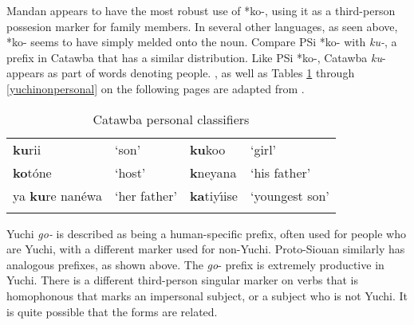 \documentclass[output=paper]{LSP/langsci}
\begin{document}
Mandan appears to have the most robust use of *ko-, using it as a third-person possesion marker for family members. In several other languages, as seen above, *ko- seems to have simply melded onto the noun. Compare PSi *ko- with \emph{ku-}, a prefix in Catawba that has a similar distribution. Like PSi *ko-, Catawba \emph{ku}- appears as part of words denoting people. , as well as Tables \ref{catawbaclassifiers} through \ref{yuchinonpersonal} on the following pages are adapted from \citet{Rankin1998scy}.

\begin{table}  
\caption{Catawba personal classifiers} \label{catawbaclassifiers}
    \begin{tabularx}{.75\textwidth}{XXXX}\lsptoprule
        \textbf{ku}rii & `son' & \textbf{ku}koo & `girl' \\ 
        \textbf{ko}t\'one & `host' & \textbf{k\textipa{@}}neyana & `his father' \\ 
			{ya \textbf{ku}re nan\'ewa} & `her father' & {\textbf{ka}tiy\'\i ise} & `youngest son' \\
\lspbottomrule
    \end{tabularx} 
\end{table}

\begin{table} 

\end{table}

Yuchi \textit{go-} is described as being a human-specific prefix, often used for people who are Yuchi, with a different marker used for non-Yuchi. Proto-Siouan similarly has analogous prefixes, as shown above. The \emph{go}- prefix is extremely productive in Yuchi. There is a different third-person singular marker on verbs that is homophonous that marks an impersonal subject, or a subject who is not Yuchi. It is quite possible that the forms are related.
\end{document}

